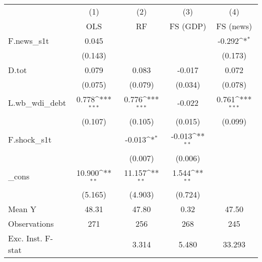 {
\def\sym#1{\ifmmode^{#1}\else\(^{#1}\)\fi}
\begin{tabular}{l*{4}{c}}
\toprule
            &\multicolumn{1}{c}{(1)}&\multicolumn{1}{c}{(2)}&\multicolumn{1}{c}{(3)}&\multicolumn{1}{c}{(4)}\\
            &\multicolumn{1}{c}{OLS}&\multicolumn{1}{c}{RF}&\multicolumn{1}{c}{FS (GDP)}&\multicolumn{1}{c}{FS (news)}\\
\midrule
F.news\_s1t  &       0.045         &                     &                     &      -0.292\sym{*}  \\
            &     (0.143)         &                     &                     &     (0.173)         \\
\addlinespace
D.tot       &       0.079         &       0.083         &      -0.017         &       0.072         \\
            &     (0.075)         &     (0.079)         &     (0.034)         &     (0.078)         \\
\addlinespace
L.wb\_wdi\_debt&       0.778\sym{***}&       0.776\sym{***}&      -0.022         &       0.761\sym{***}\\
            &     (0.107)         &     (0.105)         &     (0.015)         &     (0.099)         \\
\addlinespace
F.shock\_s1t &                     &      -0.013\sym{*}  &      -0.013\sym{**} &                     \\
            &                     &     (0.007)         &     (0.006)         &                     \\
\addlinespace
\_cons      &      10.900\sym{**} &      11.157\sym{**} &       1.544\sym{**} &                     \\
            &     (5.165)         &     (4.903)         &     (0.724)         &                     \\
\midrule
Mean Y      &       48.31         &       47.80         &        0.32         &       47.50         \\
Observations&         271         &         256         &         268         &         245         \\
Exc. Inst. F-stat&                     &       3.314         &       5.480         &      33.293         \\
\bottomrule
\end{tabular}
}

